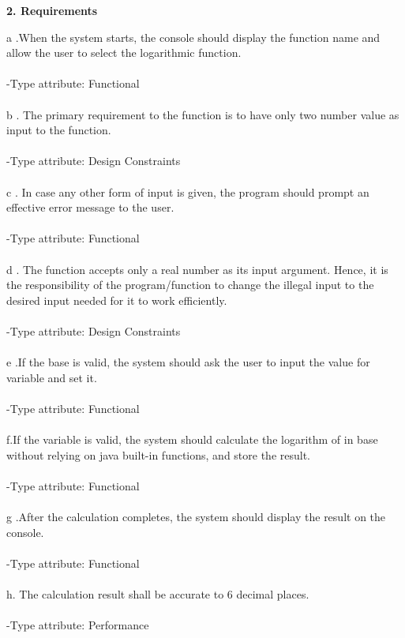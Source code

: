 \documentclass[12pt,letterpaper]{article}
\begin{document}
	\begin{flushleft}
		\large\textbf{2. Requirements}
	\end{flushleft}
	
	\begin{itemize}
	    {a .}When the system starts, the console should display the function name and allow the user to select the logarithmic function.\\
	    \\
	    -Type attribute: Functional\\
	    \\
		{b .} The primary requirement to the function is to have only two number value as input to the function.\\
		\\
		-Type attribute: Design Constraints\\
		\\
		{c .} In case any other form of input is given, the program should prompt an effective error message to the user.\\
		\\
		-Type attribute: Functional\\
		\\
		{d .} The function accepts only a real number as its input argument. Hence, it is the responsibility of the program/function to change the illegal input to the desired input needed for it to work efficiently.\\
		\\
		-Type attribute: Design Constraints
		\\
		\\
		{e .}If the base is valid, the system should ask the user
        to input the value for variable and set it.\\
        \\
        -Type attribute: Functional\\
        \\
        {f.}If the variable is valid, the system should calculate
        the logarithm of in base without relying on java built-in functions, and store the result.\\
        \\
        -Type attribute: Functional\\
        \\
        {g .}After the calculation completes, the system should display the result on the console.\\
        \\
        -Type attribute: Functional\\
        \\
        {h. }The calculation result shall be accurate to 6 decimal places.\\
        \\
        -Type attribute: Performance\\
        
	\end{itemize}
		
\end{document}
